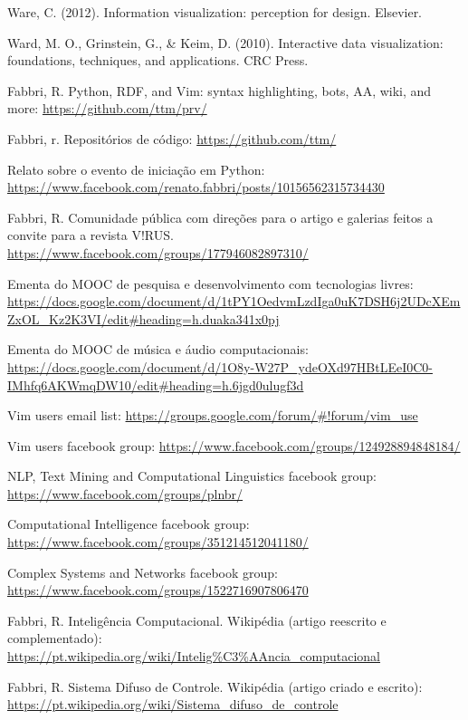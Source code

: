 \documentclass[a4paper, 11pt]{article}
\begin{document}
\begin{thebibliography}{99}
  Ware, C. (2012). Information visualization: perception for design. Elsevier.

	Ward, M. O., Grinstein, G., \& Keim, D. (2010). Interactive data visualization: foundations, techniques, and applications. CRC Press.

  Fabbri, R. Python, RDF, and Vim: syntax highlighting, bots, AA, wiki, and more: \url{https://github.com/ttm/prv/}

  Fabbri, r. Repositórios de código: \url{https://github.com/ttm/}

  Relato sobre o evento de iniciação em Python: \url{https://www.facebook.com/renato.fabbri/posts/10156562315734430}

  Fabbri, R. Comunidade pública com direções para o artigo e galerias feitos a convite para a revista V!RUS.  \url{https://www.facebook.com/groups/177946082897310/}

  Ementa do MOOC de pesquisa e desenvolvimento com tecnologias livres: \url{https://docs.google.com/document/d/1tPY1OedvmLzdIga0uK7DSH6j2UDcXEmZxOL_Kz2K3VI/edit#heading=h.duaka341x0pj}

  Ementa do MOOC de música e áudio computacionais: \url{https://docs.google.com/document/d/1O8y-W27P_ydeOXd97HBtLEeI0C0-IMhfq6AKWmqDW10/edit#heading=h.6jgd0ulugf3d}

  Vim users email list: \url{https://groups.google.com/forum/#!forum/vim_use}

  Vim users facebook group: \url{https://www.facebook.com/groups/124928894848184/}

  NLP, Text Mining and Computational Linguistics facebook group: \url{https://www.facebook.com/groups/plnbr/}

  Computational Intelligence facebook group: \url{https://www.facebook.com/groups/351214512041180/}

  Complex Systems and Networks facebook group: \url{https://www.facebook.com/groups/1522716907806470}

  Fabbri, R. Inteligência Computacional. Wikipédia (artigo reescrito e complementado): \url{https://pt.wikipedia.org/wiki/Intelig%C3%AAncia_computacional}

  Fabbri, R. Sistema Difuso de Controle. Wikipédia (artigo criado e escrito): \url{https://pt.wikipedia.org/wiki/Sistema_difuso_de_controle}


\end{thebibliography}
\end{document}
